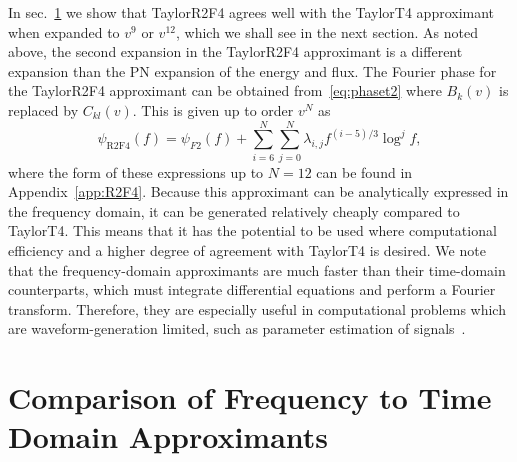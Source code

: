 In sec.~\ref{sec:freq_vs_time_approx} we show that TaylorR2F4 agrees well with the TaylorT4 approximant
when expanded to $v^9$ or $v^{12}$, which we shall see in the next section.  As
noted above, the second expansion in the TaylorR2F4 approximant is a different
expansion than the \ac{PN} expansion of the energy and flux.  The Fourier phase
for the TaylorR2F4 approximant can be obtained from~\eqref{eq:phaset2}  where
$B_{k}(v)$ is replaced by $C_{kl}(v)$.  This is given up to order $v^N$ as
%
\begin{equation}
%
\psi_{\mathrm{R2F4}}(f) = \psi_{F2}(f) + \sum_{i=6}^{N} \sum_{j=0}^{N}
\lambda_{i, j} f^{(i-5)/3} \log^j f,
%
\end{equation}
%
where the form of these expressions up to $N=12$ can be found in
Appendix~\ref{app:R2F4}.
Because this approximant can be analytically expressed in the frequency domain,
it can be generated relatively cheaply compared to TaylorT4. This means that it has
the potential to be used where computational efficiency and 
a higher degree of agreement with TaylorT4 is desired.
We note that the frequency-domain approximants are much faster than their
time-domain counterparts, which must integrate differential equations and perform 
a Fourier transform. Therefore, they are especially useful in computational problems 
which are waveform-generation limited, 
such as parameter estimation of signals~\cite{Aasi:2013jjl}.

\section{Comparison of Frequency to Time Domain Approximants}
\label{sec:freq_vs_time_approx}

